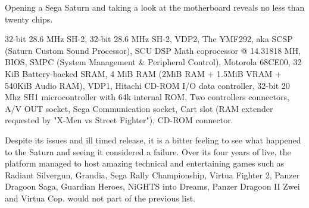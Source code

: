 \par
Opening a Sega Saturn and taking a look at the motherboard reveals no less than twenty chips.\\
\par
{} 32-bit 28.6 MHz SH-2, 
 32-bit 28.6 MHz SH-2, 
 VDP2, 
 The YMF292, aka SCSP (Saturn Custom Sound Processor), 
 SCU DSP Math coprocessor @ 14.31818 MH, 
 BIOS, 
 SMPC (System Management \& Peripheral Control), 
 Motorola 68CE00, 
 32 KiB Battery-backed SRAM, 
 4 MiB RAM (2MiB RAM + 1.5MiB VRAM + 540KiB Audio RAM), 
 VDP1, 
 Hitachi CD-ROM I/O data controller, 
 32-bit 20 Mhz SH1  microcontroller with 64k internal ROM, 
 Two controllers connectors, 
 A/V OUT socket,  
 Sega Communication socket,  
 Cart slot (RAM extender requested by "X-Men vs Street Fighter"), 
 CD-ROM connector.






Despite its issues and ill timed release, it is a bitter feeling to see what happened to the Saturn and seeing it considered a failure. Over its four years of live, the platform managed to host amazing technical and entertaining games such as Radiant Silvergun, Grandia, Sega Rally Championship, Virtua Fighter 2, Panzer Dragoon Saga, Guardian Heroes, NiGHTS into Dreams, Panzer Dragoon II Zwei and Virtua Cop. \doom would not part of the previous list.\\
\par
{}


